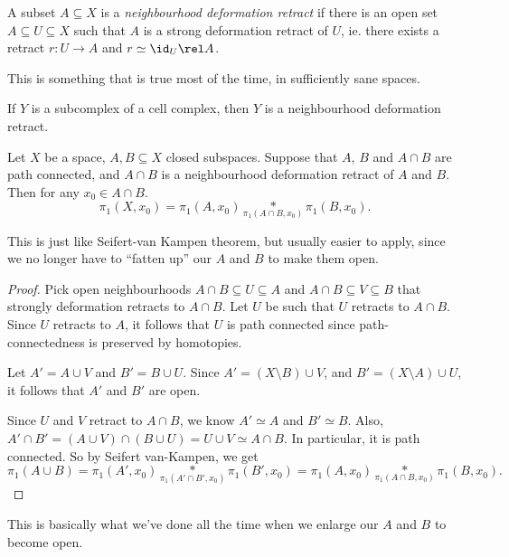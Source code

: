 \documentclass[a4paper]{article}
\begin{document}
\begin{defi}
  A subset $A\subseteq X$ is a \emph{neighbourhood deformation retract} if there is an open set $A\subseteq U\subseteq X$ such that $A$ is a strong deformation retract of $U$, ie. there exists a retract $r: U \to A$ and $r \simeq \id_U \rel A$.
\end{defi}
This is something that is true most of the time, in sufficiently sane spaces.

\begin{eg}
  If $Y$ is a subcomplex of a cell complex, then $Y$ is a neighbourhood deformation retract.
\end{eg}

\begin{thm}
  Let $X$ be a space, $A, B\subseteq X$ closed subspaces. Suppose that $A$, $B$ and $A\cap B$ are path connected, and $A\cap B$ is a neighbourhood deformation retract of $A$ and $B$. Then for any $x_0 \in A\cap B$.
  \[
    \pi_1(X, x_0) = \pi_1(A, x_0) \underset{\pi_1(A\cap B, x_0)}{*} \pi_1(B, x_0).
  \]
\end{thm}
\begin{center}
\end{center}
This is just like Seifert-van Kampen theorem, but usually easier to apply, since we no longer have to ``fatten up'' our $A$ and $B$ to make them open.

\begin{proof}
  Pick open neighbourhoods $A\cap B \subseteq U \subseteq A$ and $A \cap B \subseteq V \subseteq B$ that strongly deformation retracts to $A\cap B$. Let $U$ be such that $U$ retracts to $A \cap B$. Since $U$ retracts to $A$, it follows that $U$ is path connected since path-connectedness is preserved by homotopies.

  Let $A' = A \cup V$ and $B' = B \cup U$. Since $A' = (X \setminus B) \cup V$, and $B' = (X \setminus A) \cup U$, it follows that $A'$ and $B'$ are open.

  Since $U$ and $V$ retract to $A \cap B$, we know $A' \simeq A$ and $B' \simeq B$. Also, $A' \cap B' = (A \cup V) \cap (B \cup U) = U \cup V \simeq A \cap B$. In particular, it is path connected. So by Seifert van-Kampen, we get
  \[
    \pi_1(A \cup B) = \pi_1(A', x_0) \underset{\pi_1(A' \cap B', x_0)}{*} \pi_1(B', x_0) = \pi_1(A, x_0) \underset{\pi_1(A\cap B, x_0)}{*} \pi_1(B, x_0).
  \]
\end{proof}
This is basically what we've done all the time when we enlarge our $A$ and $B$ to become open.
\end{document}
